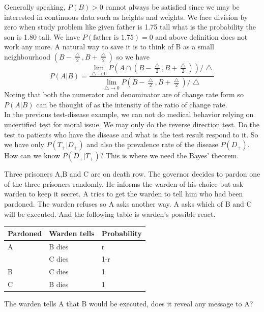 \documentclass[11pt]{report}
\begin{document}
\begin{intuition}
Generally speaking, $P(B)>0$ cannot always be satisfied since we may be interested in continuous data such as heights and weights. We face division by zero when study problem like given father is 1.75 tall what is the probability the son is 1.80 tall. We have $P(\text{father is 1.75})=0$ and above definition does not work any more. A natural way to save it is to think of B as a small neighbourhood $(B-\frac{\bigtriangleup}{2},B+\frac{\bigtriangleup}{2})$ so we have $$P(A|B)=\frac{\lim_{\bigtriangleup\rightarrow 0} P(A\cap (B-\frac{\bigtriangleup}{2},B+\frac{\bigtriangleup}{2}) )/\bigtriangleup}{\lim_{\bigtriangleup\rightarrow 0}P(B-\frac{\bigtriangleup}{2},B+\frac{\bigtriangleup}{2})/\bigtriangleup}$$  
Noting that both the numerator and denominator are of change rate form so $P(A|B)$ can be thought of as the intensity of the ratio of change rate.\\
In the previous test-disease example, we can not do medical behavior  relying on uncertified test for moral issue. We may only do the reverse direction test. Do the test to patients who have the disease and what is the test result respond to it. So we have only $P(T_+|D_+)$ and also the prevalence rate of the disease $P(D_+)$. How can we know  $P(D_+|T_+)$? This is where we need the Bayes' theorem.  
\end{intuition}
\begin{example}[Casella 1.3.4]
Three prisoners A,B and C are on death row. The governor decides to pardon one of the three prisoners randomly. He informs the warden of his choice but ask warden to keep it secret. A tries to get the warden to tell him who had been pardoned. The warden refuses so A asks another way. A asks which of B and C will be executed. And the following table is warden's possible react.  
\end{example} 
\begin{table}[h]
\centering
\begin{tabular}{lll}
Pardoned & Warden tells & Probability \\ \hline
A        & B dies       & r           \\
         & C dies       & 1-r         \\\hline
B        & C dies       & 1           \\\hline
C        & B dies       & 1          
\end{tabular}
\end{table}
The warden tells A that B would be executed, does it reveal any message to A?
\end{document}
